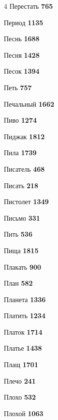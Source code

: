 \begin{multicols}{4}
\noindent Перестать \dotfill \textbf{\color{secondary} 765}\par
\noindent Период \dotfill \textbf{\color{secondary} 1135}\par
\noindent Песнь \dotfill \textbf{\color{secondary} 1688}\par
\noindent Песня \dotfill \textbf{\color{secondary} 1428}\par
\noindent Песок \dotfill \textbf{\color{secondary} 1394}\par
\noindent Петь \dotfill \textbf{\color{secondary} 757}\par
\noindent Печальный \dotfill \textbf{\color{secondary} 1662}\par
\noindent Пиво \dotfill \textbf{\color{secondary} 1274}\par
\noindent Пиджак \dotfill \textbf{\color{secondary} 1812}\par
\noindent Пила \dotfill \textbf{\color{secondary} 1739}\par
\noindent Писатель \dotfill \textbf{\color{secondary} 468}\par
\noindent Писать \dotfill \textbf{\color{secondary} 218}\par
\noindent Пистолет \dotfill \textbf{\color{secondary} 1349}\par
\noindent Письмо \dotfill \textbf{\color{secondary} 331}\par
\noindent Пить \dotfill \textbf{\color{secondary} 536}\par
\noindent Пища \dotfill \textbf{\color{secondary} 1815}\par
\noindent Плакать \dotfill \textbf{\color{secondary} 900}\par
\noindent План \dotfill \textbf{\color{secondary} 582}\par
\noindent Планета \dotfill \textbf{\color{secondary} 1336}\par
\noindent Платить \dotfill \textbf{\color{secondary} 1234}\par
\noindent Платок \dotfill \textbf{\color{secondary} 1714}\par
\noindent Платье \dotfill \textbf{\color{secondary} 1438}\par
\noindent Плащ \dotfill \textbf{\color{secondary} 1701}\par
\noindent Плечо \dotfill \textbf{\color{secondary} 241}\par
\noindent Плохо \dotfill \textbf{\color{secondary} 532}\par
\noindent Плохой \dotfill \textbf{\color{secondary} 1063}\par

\end{multicols}
